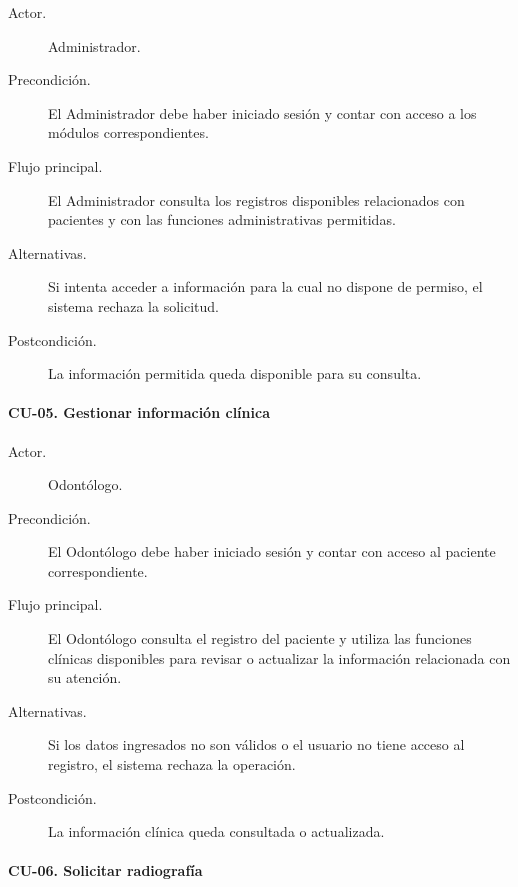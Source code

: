 \begin{description}
	
	\item[Actor.] Administrador.
	
	\item[Precondición.] El Administrador debe haber iniciado sesión y contar con
	acceso a los módulos correspondientes.
	
	\item[Flujo principal.] El Administrador consulta los registros disponibles
	relacionados con pacientes y con las funciones administrativas permitidas.
	
	\item[Alternativas.] Si intenta acceder a información para la cual no dispone
	de permiso, el sistema rechaza la solicitud.
	
	\item[Postcondición.] La información permitida queda disponible para su
	consulta.
	
\end{description}


\paragraph{CU-05. Gestionar información clínica}

\begin{description}
	
	\item[Actor.] Odontólogo.
	
	\item[Precondición.] El Odontólogo debe haber iniciado sesión y contar con
	acceso al paciente correspondiente.
	
	\item[Flujo principal.] El Odontólogo consulta el registro del paciente y
	utiliza las funciones clínicas disponibles para revisar o actualizar la
	información relacionada con su atención.
	
	\item[Alternativas.] Si los datos ingresados no son válidos o el usuario no
	tiene acceso al registro, el sistema rechaza la operación.
	
	\item[Postcondición.] La información clínica queda consultada o actualizada.
	
\end{description}


\paragraph{CU-06. Solicitar radiografía}

